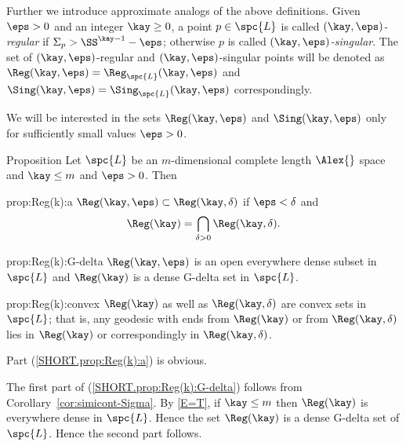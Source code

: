Further we introduce approximate analogs of the above definitions.
Given $\eps>0$ and an integer $\kay\ge 0$,
a point $p\in\spc{L}$ is called \emph{$(\kay,\eps)$-regular} if
$\Sigma_p>\SS^{\kay-1}-\eps$;
otherwise $p$ is called 
\emph{$(\kay,\eps)$-singular}.
The set of $(\kay,\eps)$-regular and $(\kay,\eps)$-singular points will be denoted as $\Reg(\kay,\eps)=\Reg_{\spc{L}}(\kay,\eps)$
and $\Sing(\kay,\eps)=\Sing_{\spc{L}}(\kay,\eps)$ correspondingly.

We will be interested in the sets $\Reg(\kay,\eps)$ and $\Sing(\kay,\eps)$ only for sufficiently small values $\eps>0$.

\begin{thm}{Proposition}\label{prop:Reg(k)}
Let $\spc{L}$ be an $m$-dimensional complete length $\Alex{}$ space and $\kay\le m$ and $\eps>0$.
Then 

\begin{subthm}{prop:Reg(k):a}
$\Reg(\kay,\eps)\subset \Reg(\kay,\delta)$ if $\eps<\delta$
and 
\[\Reg(\kay)=\bigcap_{\delta>0}\Reg(\kay,\delta).\]
\end{subthm}

\begin{subthm}{prop:Reg(k):G-delta}
$\Reg(\kay,\eps)$ is an open everywhere dense subset in $\spc{L}$
and 
$\Reg(\kay)$ is a dense G-delta set in $\spc{L}$.
\end{subthm}

\begin{subthm}{prop:Reg(k):convex}
 $\Reg(\kay)$ as well as $\Reg(\kay,\delta)$ are convex sets in $\spc{L}$;
that is, any geodesic with ends from $\Reg(\kay)$ or from $\Reg(\kay,\delta)$ 
lies in $\Reg(\kay)$ or correspondingly in $\Reg(\kay,\delta)$.
\end{subthm}



\end{thm}

Part (\ref{SHORT.prop:Reg(k):a}) is obvious.

The first part of (\ref{SHORT.prop:Reg(k):G-delta}) follows from Corollary~\ref{cor:simicont-Sigma}.
By \ref{E=T},
if $\kay\le m$ then  $\Reg(\kay)$ is everywhere dense in $\spc{L}$.
Hence the set $\Reg(\kay)$ is a dense G-delta set of $\spc{L}$.
Hence the second part follows.

